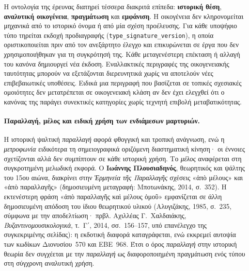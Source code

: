 \documentclass[11pt,a4paper]{article}
\begin{document}
Η οντολογία της έρευνας διατηρεί τέσσερα διακριτά επίπεδα: \textbf{ιστορική θέση}, \textbf{αναλυτική οικογένεια}, \textbf{πραγμάτωση} και \textbf{εμφάνιση}. Η οικογένεια δεν κληρονομείται μηχανικά από το ιστορικό όνομα ή από μία σχέση προέλευσης. Για κάθε υποψήφιο τύπο τηρείται εκδοχή προδιαγραφής (\texttt{type\_signature\_version}), η οποία οριστικοποιείται πριν από τον ανεξάρτητο έλεγχο και επικυρώνεται σε έργα που δεν χρησιμοποιήθηκαν για τη συγκρότησή της. Κάθε μεταγενέστερη επέκταση ή αλλαγή του κανόνα δημιουργεί νέα έκδοση. Εναλλακτικές περιγραφές της οικογενειακής ταυτότητας μπορούν να εξετάζονται διερευνητικά χωρίς να αποτελούν νέες επιβεβαιωτικές υποθέσεις. Ειδικά μια περιγραφή που βασίζεται σε τοπικές σχεσιακές ομοιότητες δεν μετατρέπεται σε οικογενειακή κλάση αν δεν έχει ελεγχθεί ότι ο κανόνας της παράγει συνεκτικές κατηγορίες χωρίς τεχνητή επιβολή μεταβατικότητας.

\paragraph{Παραλλαγή, μέλος και ειδική χρήση των ενδιάμεσων μαρτυριών.}
Η ιστορική ψαλτική \emph{παραλλαγή} αφορά φθογγική και τροπική ανάγνωση, ενώ η \emph{μετροφωνία} ειδικότερα τη σημειογραφικά οριζόμενη διαστηματική κίνηση· οι έννοιες σχετίζονται αλλά δεν συμπίπτουν σε κάθε ιστορική χρήση. Το \emph{μέλος} αναφέρεται στη συγκροτημένη μελωδική εκφορά. Ο \textbf{Ιωάννης Πλουσιαδηνός}, θεωρητικός και ψάλτης του 15ου αιώνα, διακρίνει στην \emph{Ἑρμηνεία τῆς Παραλλαγῆς} σχέσεις «ἀπὸ μέλους» και «ἀπὸ παραλλαγῆς» (δημοσιευμένη μεταγραφή: Μποτωνάκης, 2014, σ.~352). Η εκτενέστερη φράση «ἀπὸ παραλλαγῆς καὶ μέλους ὁμοῦ» εμφανίζεται σε άλλη δημοσιευμένη απόδοση του ίδιου θεωρητικού υλικού (Αλυγιζάκης, 1985, σ.~235, σύμφωνα με την αποδελτίωση· πρβλ. Αχιλλέας Γ.~Χαλδαιάκης, \emph{Βυζαντινομουσικολογικά}, τ.~Γ΄, 2014, σσ.~156--157, υπό επανέλεγχο της συγκεκριμένης σελίδας): η εκδοτική διαφορά καταγράφεται, ενώ εκκρεμεί αυτοψία των κωδίκων Διονυσίου~570 και ΕΒΕ~968. Έτσι ο όρος \emph{παραλλαγή} στην ιστορική θεωρία δεν συγχέεται με την \emph{παραλλαγή} ως διαφοροποιημένη πραγμάτωση ενός τύπου στη σύγχρονη αναλυτική χρήση.
\end{document}
